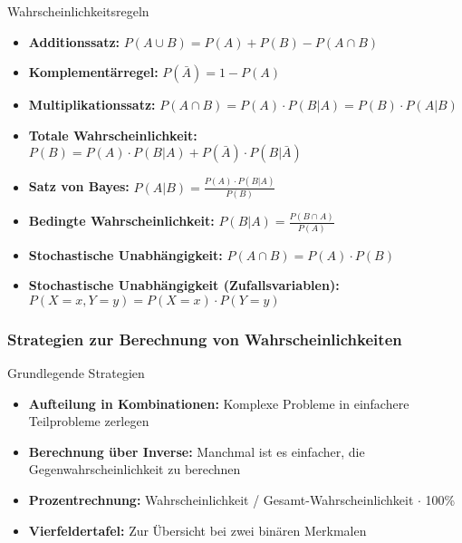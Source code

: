 \begin{corollary}{Wahrscheinlichkeitsregeln}
\begin{itemize}
    \item \textbf{Additionssatz:} $P(A \cup B) = P(A) + P(B) - P(A \cap B)$
    \item \textbf{Komplementärregel:} $P(\bar{A}) = 1 - P(A)$
    \item \textbf{Multiplikationssatz:} $P(A \cap B) = P(A) \cdot P(B|A) = P(B) \cdot P(A|B)$
    \item \textbf{Totale Wahrscheinlichkeit:} $P(B) = P(A) \cdot P(B|A) + P(\bar{A}) \cdot P(B|\bar{A})$
    \item \textbf{Satz von Bayes:} $P(A|B) = \frac{P(A) \cdot P(B|A)}{P(B)}$
    \item \textbf{Bedingte Wahrscheinlichkeit:} $P(B|A) = \frac{P(B \cap A)}{P(A)}$
    \item \textbf{Stochastische Unabhängigkeit:} $P(A \cap B) = P(A) \cdot P(B)$
    \item \textbf{Stochastische Unabhängigkeit (Zufallsvariablen):} $P(X=x, Y=y) = P(X=x) \cdot P(Y=y)$
\end{itemize}   
\end{corollary}

\subsubsection{Strategien zur Berechnung von Wahrscheinlichkeiten}

\begin{concept}{Grundlegende Strategien}
\begin{itemize}
    \item \textbf{Aufteilung in Kombinationen:} Komplexe Probleme in einfachere Teilprobleme zerlegen
    \item \textbf{Berechnung über Inverse:} Manchmal ist es einfacher, die Gegenwahrscheinlichkeit zu berechnen
    \item \textbf{Prozentrechnung:} Wahrscheinlichkeit / Gesamt-Wahrscheinlichkeit $\cdot$ 100\%
    \item \textbf{Vierfeldertafel:} Zur Übersicht bei zwei binären Merkmalen
\end{itemize}
\end{concept}

